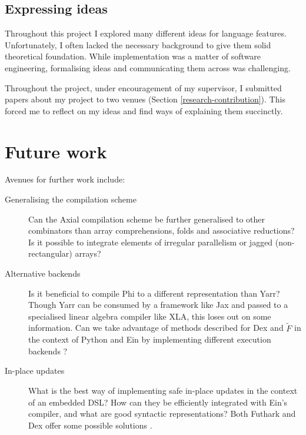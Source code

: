 \subsection{Expressing ideas}

Throughout this project I explored many different ideas for language features. 
Unfortunately, I often lacked the necessary background to give them solid theoretical foundation. 
While implementation was a matter of software engineering, formalising ideas and communicating them across was challenging. 

Throughout the project, under encouragement of my supervisor, I submitted papers about my project to two venues (Section \ref{research-contribution}). 
This forced me to reflect on my ideas and find ways of explaining them succinctly.

\section{Future work}

Avenues for further work include:
\begin{description}
    \item[Generalising the compilation scheme] Can the Axial compilation scheme be further generalised to other combinators than array comprehensions, folds and associative reductions? Is it possible to integrate elements of irregular parallelism or jagged (non-rectangular) arrays?
    \item[Alternative backends] Is it beneficial to compile Phi to a different representation than Yarr? Though Yarr can be consumed by a framework like Jax and passed to a specialised linear algebra compiler like XLA, this loses out on some information. Can we take advantage of methods described for Dex and $\tilde F$ in the context of Python and Ein by implementing different execution backends \cite{shaikhha2019efficient, paszke2021getting}?
    \item[In-place updates] What is the best way of implementing safe in-place updates in the context of an embedded DSL? How can they be efficiently integrated with Ein's compiler, and what are good syntactic representations? Both Futhark and Dex offer some possible solutions \cite{henriksen2017futhark, paszke2021getting}.
\end{description}
